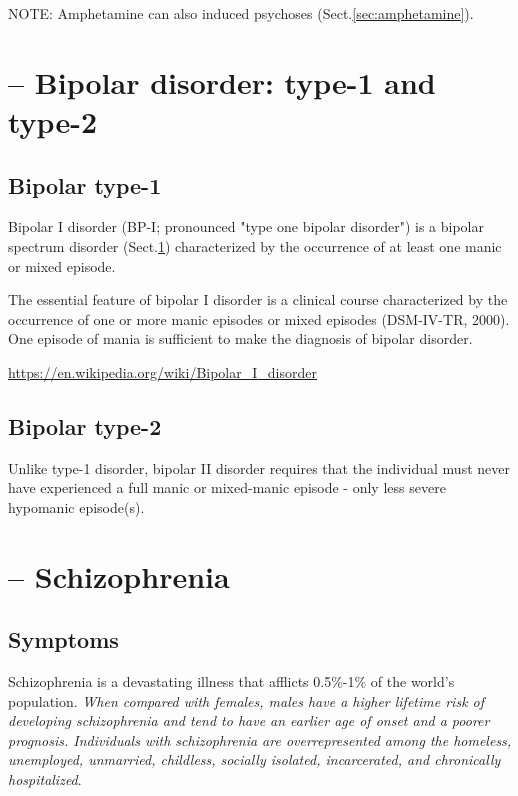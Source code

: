 NOTE: Amphetamine can also induced psychoses (Sect.\ref{sec:amphetamine}).

\section{-- Bipolar disorder: type-1 and type-2}
\label{sec:bipolar-disorder}

\subsection{Bipolar type-1}
\label{sec:bipolar-type-1}

Bipolar I disorder (BP-I; pronounced "type one bipolar disorder") is a bipolar
spectrum disorder (Sect.\ref{sec:bipolar-disorder}) characterized by the
occurrence of at least one manic or mixed episode.

The essential feature of bipolar I disorder is a clinical course characterized
by the occurrence of one or more manic episodes or mixed episodes (DSM-IV-TR,
2000). One episode of mania is sufficient to make the diagnosis of bipolar
disorder.

\url{https://en.wikipedia.org/wiki/Bipolar_I_disorder}


\subsection{Bipolar type-2}
\label{sec:bipolar-type-2}

Unlike type-1 disorder, bipolar II disorder requires that the individual must
never have experienced a full manic or mixed-manic episode - only less severe
hypomanic episode(s).




\section{-- Schizophrenia}
\label{sec:schizophrenia}


\subsection{Symptoms}
\label{sec:schizophrenia-symptom}

Schizophrenia is a devastating illness that afflicts 0.5\%-1\% of the world's
population.
{\it When compared with females, males have a higher lifetime risk of developing
schizophrenia and tend to have an earlier age of onset and a poorer prognosis.
Individuals with schizophrenia are overrepresented among the homeless,
unemployed, unmarried, childless, socially isolated, incarcerated, and
chronically hospitalized}.

